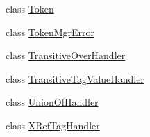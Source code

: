 \begin{DoxyCompactItemize}
class \hyperlink{classorg_1_1coode_1_1owlapi_1_1obo_1_1parser_1_1_token}{Token}
\item 
class \hyperlink{classorg_1_1coode_1_1owlapi_1_1obo_1_1parser_1_1_token_mgr_error}{Token\-Mgr\-Error}
\item 
class \hyperlink{classorg_1_1coode_1_1owlapi_1_1obo_1_1parser_1_1_transitive_over_handler}{Transitive\-Over\-Handler}
\item 
class \hyperlink{classorg_1_1coode_1_1owlapi_1_1obo_1_1parser_1_1_transitive_tag_value_handler}{Transitive\-Tag\-Value\-Handler}
\item 
class \hyperlink{classorg_1_1coode_1_1owlapi_1_1obo_1_1parser_1_1_union_of_handler}{Union\-Of\-Handler}
\item 
class \hyperlink{classorg_1_1coode_1_1owlapi_1_1obo_1_1parser_1_1_x_ref_tag_handler}{X\-Ref\-Tag\-Handler}
\end{DoxyCompactItemize}
